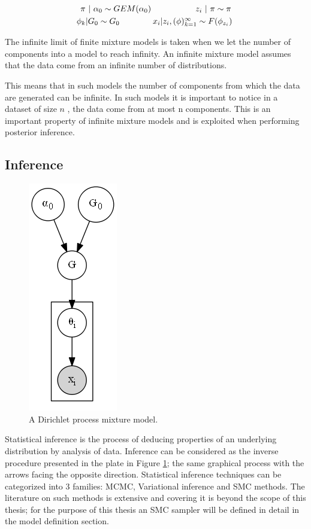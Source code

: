 \documentclass [twoside,hidelinks]{article}
\begin{document}
	\begin{equation}
		\begin{aligned}
			\centerline{ \textbf{$\pi$} $|$  $ \alpha_0  \sim GEM (\alpha_0 )\ \ \ \ \ \ \ \ \ \ \ \ \ \ \ \   z_i$ $|$ \textbf{$ \pi \sim \pi  $} } \\
			\centerline{$ \phi_k | G_0 \sim G_0 $\ \ \ \ \ \ \ \ \ \ \ \ $x_i | z_i,  (\phi )_{k=1}^\infty \sim F (\phi_{z_i}) $  } \\
		\end{aligned}
	\end{equation}

The infinite limit of finite mixture models is taken when we let the number of components into a model to reach infinity. An infinite mixture model assumes that the data come from an infinite number of distributions.

This means that in such models the number of components from which the data are generated can be infinite. In such models it is important to notice in a dataset of size $n$ , the data come from at most n components. This is an important property of infinite mixture models and is exploited when performing posterior inference.

\subsection{Inference}
\begin{figure}
          \centerline{\includegraphics [width=.17\textwidth]{dpmm3}}
	\caption{A Dirichlet process mixture model.}
	\label{mm}
\end{figure}


Statistical inference is the process of deducing properties of an underlying distribution by analysis of data. Inference can be considered as the inverse procedure presented in the plate in Figure \ref{mm}; the same graphical process with the arrows facing the opposite direction. Statistical inference techniques can be categorized into 3 families: MCMC, Variational inference and SMC methods. The literature on such methods is extensive and covering it is beyond the scope of this thesis; for the purpose of this thesis an SMC sampler will be defined in detail in the model definition section. 
\end{document}
